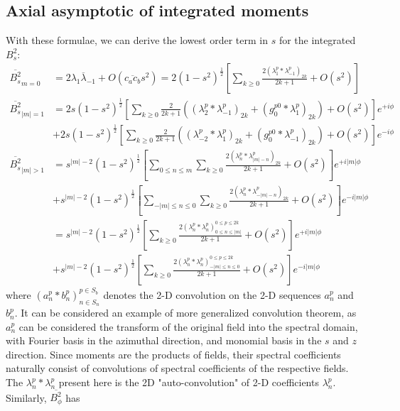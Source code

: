 \subsection{Axial asymptotic of integrated moments}

With these formulae, we can derive the lowest order term in $s$ for the integrated $B_s^2$:
\begin{equation}
    \begin{aligned}
        \overline{B_s^2}_{m=0} &= 2 \overline{\lambda_1 \lambda_{-1}} + O\left(\overline{c_a c_b} s^2\right) = 2\left(1 - s^2\right)^{\frac{1}{2}} \left[\sum_{k\geq 0} \frac{2 (\lambda_1^p * \lambda_{-1}^p)_{2k}}{2k+1} + O\left(s^2\right)\right] \\ 
        \overline{B_s^2}_{|m|=1} &= 2 s \left(1 - s^2\right)^{\frac{1}{2}} \left[\sum_{k\geq 0} \frac{2}{2k+1} \left((\lambda_2^p * \lambda_{-1}^p)_{2k} + (g_0^{p0} * \lambda_{1}^p)_{2k}\right) + O\left(s^2\right)\right] e^{+i\phi} \\ 
        &+ 2 s \left(1 - s^2\right)^{\frac{1}{2}} \left[\sum_{k\geq 0} \frac{2}{2k+1} \left((\lambda_{-2}^p * \lambda_{1}^p)_{2k} + (g_0^{p0} * \lambda_{-1}^p)_{2k}\right) + O\left(s^2\right)\right] e^{-i\phi} \\
        \overline{B_s^2}_{|m|>1} &= s^{|m|-2} \left(1 - s^2\right)^{\frac{1}{2}} \left[\sum_{0\leq n \leq m} \sum_{k\geq 0} \frac{2(\lambda_n^p * \lambda_{|m|-n}^p)_{2k}}{2k+1} + O\left(s^2\right)\right] e^{+i|m|\phi} \\ 
        &+ s^{|m|-2} \left(1 - s^2\right)^{\frac{1}{2}} \left[\sum_{-|m|\leq n \leq 0} \sum_{k\geq 0} \frac{2(\lambda_n^p * \lambda_{-|m|-n}^p)_{2k}}{2k+1} + O\left(s^2\right)\right] e^{-i|m|\phi} \\
        &= s^{|m|-2} \left(1 - s^2\right)^{\frac{1}{2}} \left[\sum_{k\geq 0} \frac{2(\lambda_n^p * \lambda_{n}^p)_{0\leq n \leq |m|}^{0\leq p \leq 2k}}{2k+1} + O\left(s^2\right)\right] e^{+i|m|\phi} \\ 
        &+ s^{|m|-2} \left(1 - s^2\right)^{\frac{1}{2}} \left[\sum_{k\geq 0} \frac{2(\lambda_n^p * \lambda_{n}^p)_{-|m|\leq n \leq 0}^{0\leq p \leq 2k}}{2k+1} + O\left(s^2\right)\right] e^{-i|m|\phi}
    \end{aligned}
\end{equation}
where $(a_n^p * b_n^p)_{n\in S_n}^{p \in S_b}$ denotes the 2-D convolution on the 2-D sequences $a_n^p$ and $b_n^p$. It can be considered an example of more generalized convolution theorem, as $a_n^p$ can be considered the transform of the original field into the spectral domain, with Fourier basis in the azimuthal direction, and monomial basis in the $s$ and $z$ direction. Since moments are the products of fields, their spectral coefficients naturally consist of convolutions of spectral coefficients of the respective fields. The $\lambda_n^p * \lambda_n^p$ present here is the 2D "auto-convolution" of 2-D coefficients $\lambda_n^p$. Similarly, $\overline{B_\phi^2}$ has
